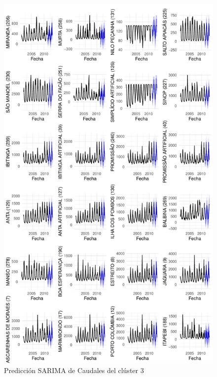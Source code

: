 \documentclass[12pt,oneside]{book}\usepackage[]{graphicx}\usepackage[]{color}
\makeatletter
\def\maxwidth{ %
  \ifdim\Gin@nat@width>\linewidth
    \linewidth
  \else
    \Gin@nat@width
  \fi
}
\newenvironment{knitrout}{}{} %
\theoremstyle{definition} %
\makeatother
\begin{document}
\begin{knitrout}
\color{fgcolor}\begin{figure}[h]

{\centering \includegraphics[width=\maxwidth,height=0.85\textheight]{figure/unnamed-chunk-90-1} 

}

\caption{\label{fig:pred_cl3_2} Predicción SARIMA de Caudales del clúster 3}\label{fig:unnamed-chunk-90}
\end{figure}


\end{knitrout}
\end{document}
